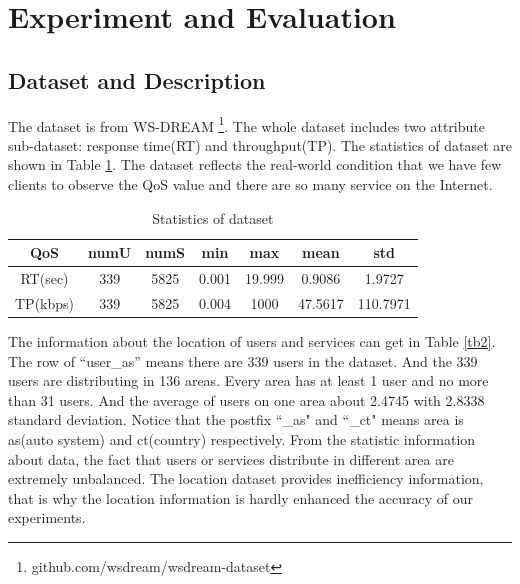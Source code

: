 \documentclass[conference]{IEEEtran}
\begin{document}
\section{Experiment and Evaluation}\label{S-EE}
\subsection{Dataset and Description}
The dataset is from WS-DREAM \footnote{github.com/wsdream/wsdream-dataset}. The whole dataset includes two attribute sub-dataset: response time(RT) and throughput(TP). The statistics of dataset are shown in Table \ref{tb1}. The dataset reflects the real-world condition that we have few clients to observe the QoS value and there are so many service on the Internet. 
\begin{table}[H]
\begin{threeparttable}
\caption{Statistics of dataset}
\label{tb1}
\begin{tabular}{c||c|c|c|c|c|c} 
\hline 
QoS & numU & numS & min & max & mean & std \\ 
\hline 
RT(sec) & 339   & 5825  & 0.001 & 19.999 & 0.9086 & 1.9727 \\ 
\hline 
TP(kbps) & 339   & 5825  & 0.004 & 1000  & 47.5617 & 110.7971  \\ 
\hline 
\end{tabular} 
\end{threeparttable}
\end{table}

\par The information about the location of users and services can get in Table \ref{tb2}. The row of ``user\_as'' means there are 339 users in the dataset. And the 339 users are distributing in 136 areas. Every area has at least 1 user and no more than 31 users. And the average of users on one area about 2.4745 with 2.8338 standard deviation. Notice that the postfix ``\_as" and ``\_ct" means area is as(auto system) and ct(country) respectively. From the statistic information about data, the fact that users or services distribute in different area are extremely unbalanced. The location dataset provides inefficiency information, that is why the location information is hardly enhanced the accuracy of our experiments.
\end{document}

